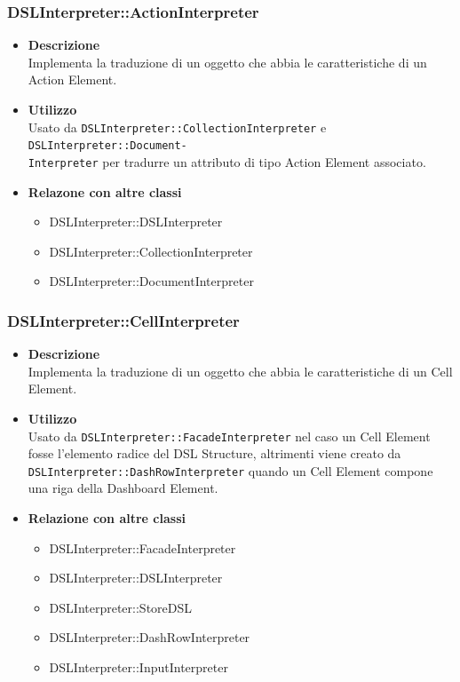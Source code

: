 \subsubsection{DSLInterpreter::ActionInterpreter}
\begin{itemize}
\item \textbf{Descrizione} \hfill \\
Implementa la traduzione di un oggetto che abbia le caratteristiche di un Action Element.
\item \textbf{Utilizzo} \hfill \\
Usato da \texttt{DSLInterpreter::CollectionInterpreter} e \texttt{DSLInterpreter::Document-}\\\texttt{Interpreter} per tradurre un attributo di tipo Action Element associato.
\item \textbf{Relazone con altre classi}
\begin{itemize}
\item DSLInterpreter::DSLInterpreter
\item DSLInterpreter::CollectionInterpreter
\item DSLInterpreter::DocumentInterpreter
\end{itemize}
\end{itemize}

\subsubsection{DSLInterpreter::CellInterpreter}
\begin{itemize}
\item \textbf{Descrizione} \hfill \\
Implementa la traduzione di un oggetto che abbia le caratteristiche di un Cell Element.
\item \textbf{Utilizzo} \hfill \\
Usato da \texttt{DSLInterpreter::FacadeInterpreter} nel caso un Cell Element fosse l'elemento radice del DSL Structure, altrimenti viene creato da \\\texttt{DSLInterpreter::DashRowInterpreter} quando un Cell Element compone una riga della Dashboard Element.
\item \textbf{Relazione con altre classi}
\begin{itemize}
\item DSLInterpreter::FacadeInterpreter
\item DSLInterpreter::DSLInterpreter
\item DSLInterpreter::StoreDSL
\item DSLInterpreter::DashRowInterpreter
\item DSLInterpreter::InputInterpreter
\end{itemize}
\end{itemize}

